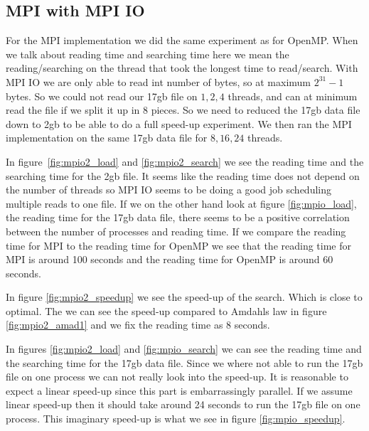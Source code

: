 \documentclass[a4paper,10pt]{article}
\begin{document}
\clearpage
\subsection{MPI with MPI IO}
  For the MPI implementation we did the same experiment as for OpenMP. When we talk about
  reading time and searching time here we mean the reading/searching on the thread that
  took the longest time to read/search.
  With MPI IO we are only able to read int number of bytes, so at maximum $2^{31}-1$ bytes.
  So we could not read our 17gb file on $1,2,4$ threads, and can at minimum read the file if we
  split it up in 8  pieces.  So we need to reduced the 17gb data file down to 2gb to be able to do a full
  speed-up experiment.  We then ran the MPI implementation on the same 17gb data file for 
  $8,16,24$ threads.

  In figure~\ref{fig:mpio2_load} and \ref{fig:mpio2_search} we see the reading time and
  the searching time for the 2gb file.  It seems like the reading time does not depend
  on the number of threads so MPI IO seems to be doing a good job scheduling multiple 
  reads to one file.  If we on the other hand look at figure \ref{fig:mpio_load}, 
  the reading time for the 17gb data file, there seems to be a positive correlation
  between the number of processes and reading time. If we compare the reading time
  for MPI to the reading time for OpenMP we see that the reading time
  for MPI is around 100 seconds and the reading time for OpenMP is around 60 seconds.
  

  In figure \ref{fig:mpio2_speedup} we see the speed-up of the search.  Which is
  close to optimal.  The we can see the speed-up compared to Amdahls law in figure \ref{fig:mpio2_amad1}
  and we fix the reading time as $8$ seconds.

  In figures \ref{fig:mpio2_load} and \ref{fig:mpio_search} we can see the reading time and 
  the searching time for the 17gb data file.  Since we where not able to run the 17gb file 
  on one process we can not really look into the speed-up.  
  It is reasonable to expect a linear speed-up since this part is embarrassingly parallel.
  If we assume linear speed-up then it should take around 24 seconds to run the 17gb file on one process.
  This imaginary speed-up is what we see in figure \ref{fig:mpio_speedup}.
\end{document}
